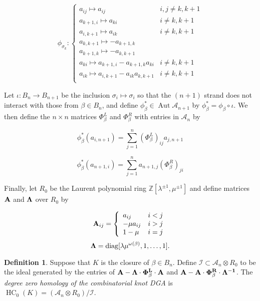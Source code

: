 \documentclass[11pt]{amsart}
\def\Z{{\mathbb Z}}
\def\A{{\mathcal A}}
\def\s{{\sigma}}
\newcommand\Aut{\operatorname{Aut}}
\newcommand\diag{\operatorname{diag}}
\theoremstyle{definition}
\newtheorem{defn}[thm]{Definition}
\begin{document}
  \begin{equation}
  \phi_{\s_k}\colon
  \left\{
       \begin{array}{lr}
         a_{ij}\mapsto a_{ij} & i,j\ne k,k+1\\
         a_{k+1,i}\mapsto a_{ki} & i\ne k,k+1\\
         a_{i,k+1}\mapsto a_{ik} & i\ne k,k+1\\
         a_{k,k+1}\mapsto -a_{k+1,k} & \\
         a_{k+1,k}\mapsto -a_{k,k+1} & \\
         a_{ki}\mapsto a_{k+1,i} - a_{k+1,k}a_{ki} & i\ne k,k+1\\
         a_{ik}\mapsto a_{i,k+1} - a_{ik}a_{k,k+1} & i\ne k,k+1\\
       \end{array}
  \right.
  \label{DefnPhiMap}
  \end{equation}

  Let $\iota\colon B_n \rightarrow B_{n+1}$ be the inclusion $\s_i\mapsto\s_i$ so that the $(n+1)$ strand does not interact with those from $\beta\in B_n$, and define $\phi_\beta^*\in \Aut \A_{n+1}$ by $\phi_\beta^* = \phi_\beta\circ\iota$. We then define the $n\times n$ matrices $\Phi_\beta^L$ and $\Phi_\beta^R$ with entries in $\A_n$ by

  $$\phi_\beta^*(a_{i,n+1}) = \sum_{j=1}^n(\Phi_\beta^L)_{ij}a_{j,n+1}$$

  $$\phi_\beta^*(a_{n+1,i}) = \sum_{j=1}^na_{n+1,j}(\Phi_\beta^R)_{ji}$$

  Finally, let $R_0$ be the Laurent polynomial ring $\Z[\lambda^{\pm1},\mu^{\pm1}]$ and define matrices $\bf{A}$ and $\bf{\Lambda}$ over $R_0$ by

  \begin{equation}
  {\bf A}_{ij} = 
  \left\{
       \begin{array}{lr}
        a_{ij} & i<j\\
        -\mu a_{ij} & i>j\\
        1-\mu & i = j\\
       \end{array}
  \right.
  \label{def:Amatrix}
  \end{equation}
  \begin{equation}
  {\bf \Lambda} = \diag[\lambda\mu^{\omega(\beta)},1,\ldots,1].
  \label{defn:Lambda}
  \end{equation}

  \begin{defn}
  Suppose that $K$ is the closure of $\beta\in B_n$. Define $\mathcal{I}\subset \A_n\otimes R_0$ to be the ideal generated by the entries of $\bf{A} - \Lambda\cdot\Phi_\beta^L\cdot \bf{A}$ and $\bf{A} - \bf{A}\cdot\Phi_\beta^R\cdot\Lambda^{-1}$. The \emph{degree zero homology of the combinatorial knot DGA} is $\operatorname{HC}_0(K) = (\A_n\otimes R_0)/\mathcal{I}$.
  \label{defn:HC_0}
  \end{defn}
  
\end{document}
